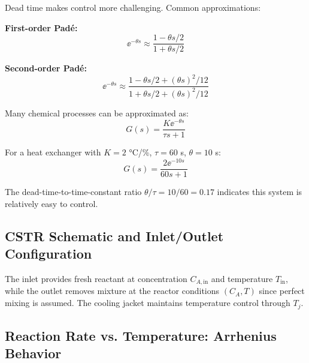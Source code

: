 Dead time makes control more challenging. Common approximations:

\textbf{First-order Padé:}
\begin{equation}
\ee^{-\theta s} \approx \frac{1 - \theta s/2}{1 + \theta s/2}
\end{equation}

\textbf{Second-order Padé:}
\begin{equation}
\ee^{-\theta s} \approx \frac{1 - \theta s/2 + (\theta s)^2/12}{1 + \theta s/2 + (\theta s)^2/12}
\end{equation}

\begin{examplebox}[title=Example 1.13: First-Order Plus Dead Time (FOPDT)]
Many chemical processes can be approximated as:
\begin{equation}
G(s) = \frac{K\ee^{-\theta s}}{\tau s + 1}
\end{equation}

For a heat exchanger with $K = 2$ °C/\%, $\tau = 60$ s, $\theta = 10$ s:
\begin{equation}
G(s) = \frac{2\ee^{-10s}}{60s + 1}
\end{equation}

The dead-time-to-time-constant ratio $\theta/\tau = 10/60 = 0.17$ indicates this system is relatively easy to control.
\end{examplebox}

\subsection{CSTR Schematic and Inlet/Outlet Configuration}
\label{subsec:cstr_schematic_detailed}



The inlet provides fresh reactant at concentration $C_{A,\text{in}}$ and temperature $T_{\text{in}}$, while the outlet removes mixture at the reactor conditions $(C_A, T)$ since perfect mixing is assumed. The cooling jacket maintains temperature control through $T_j$.

\subsection{Reaction Rate vs. Temperature: Arrhenius Behavior}
\label{subsec:reaction_rate_temperature}

